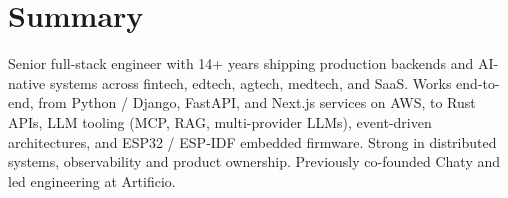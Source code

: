 \section{Summary}

Senior full-stack engineer with 14+ years shipping production backends
and AI-native systems across fintech, edtech, agtech, medtech, and SaaS.
Works end-to-end, from Python / Django, FastAPI, and Next.js services
on AWS, to Rust APIs, LLM tooling (MCP, RAG, multi-provider LLMs),
event-driven architectures, and ESP32 / ESP-IDF embedded firmware.
Strong in distributed systems, observability and
product ownership. Previously co-founded Chaty and led engineering at
Artificio.
